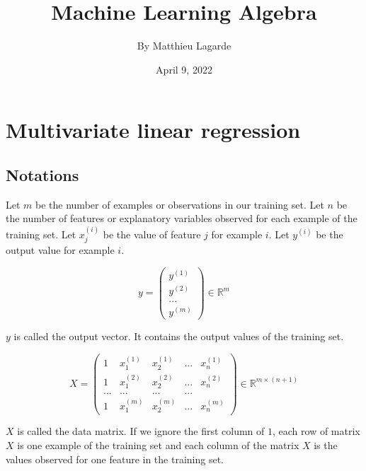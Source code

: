 \documentclass[a4paper, 12pt]{article}
\begin{document}
\title{\Large{\textbf{Machine Learning Algebra}}}
\author{By Matthieu Lagarde}
\date{April 9, 2022}

\maketitle

\setcounter{page}{2}

\newpage
\section{Multivariate linear regression}
\subsection{Notations}

Let $m$ be the number of examples or observations in our training set. Let $n$ be the number of features or explanatory variables observed for each example of the training set. Let $x_j^{(i)}$ be the value of feature $j$ for example $i$. Let $y^{(i)}$ be the output value for example $i$.

\begin{equation}
y = \begin{pmatrix}  y^{(1)} \\ y^{(2)} \\ ... \\ y^{(m)} \end{pmatrix} \in \mathbb{R}^{m} 
\end{equation}

\noindent
$y$ is called the output vector. It contains the output values of the training set.

\begin{equation}
X = \begin{pmatrix} 1 & x_1^{(1)} & x_2^{(1)} & ... & x_n^{(1)} \\  1 & x_1^{(2)} & x_2^{(2)} & ... & x_n^{(2)} \\ ... & ... & ... & ... \\ 1 & x_1^{(m)} & x_2^{(m)} & ... & x_n^{(m)} \end{pmatrix} \in \mathbb{R}^{m\times(n+1)} 
\end{equation}

\noindent
$X$ is called the data matrix. If we ignore the first column of $1$, each row of matrix $X$ is one example of the training set and each column of the matrix $X$ is the values observed for one feature in the training set.
\end{document}
